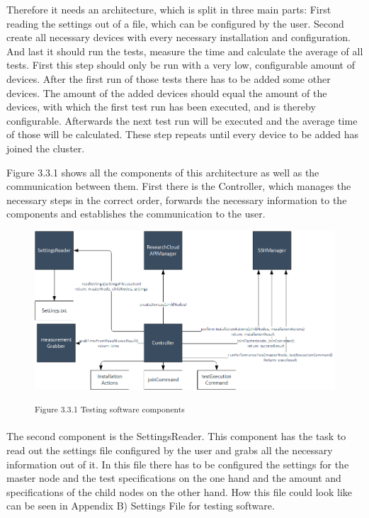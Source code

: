 Therefore it needs an architecture, which is split in three main parts: First reading the settings out of a file, which can be configured by the user. Second create all necessary devices with every necessary installation and configuration. And last it should run the tests, measure the time and calculate the average of all tests. First this step should only be run with a very low, configurable amount of devices. After the first run of those tests there has to be added some other devices. The amount of the added devices should equal the amount of the devices, with which the first test run has been executed, and is thereby configurable. Afterwards the next test run will be executed and the average time of those will be calculated. These step repeats until every device to be added has joined the cluster.

Figure 3.3.1 shows all the components of this architecture as well as the communication between them. First there is the Controller, which manages the necessary steps in the correct order, forwards the necessary information to the components and establishes the communication to the user.

\begin{figure}[h]
\centering
\includegraphics[width=\textwidth]{images/testing_software_components.png}

\textsuperscript{Figure 3.3.1 Testing software components}
\end{figure}

The second component is the SettingsReader. This component has the task to read out the settings file configured by the user and grabs all the necessary information out of it. In this file there has to be configured the settings for the master node and the test specifications on the one hand and the amount and specifications of the child nodes on the other hand. How this file could look like can be seen in Appendix B) Settings File for testing software.


